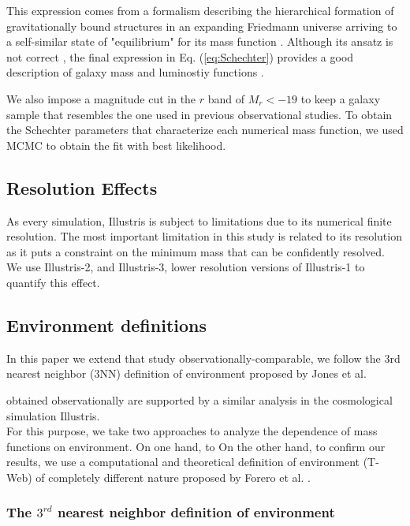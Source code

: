 \documentclass[a4paper,fleqn,usenatbib]{mnras}
\begin{document}
This expression comes from a formalism describing the hierarchical
formation of gravitationally bound structures in an expanding
Friedmann universe arriving to a self-similar state of "equilibrium"
for its mass function \cite{Schechter1976}. 
Although its ansatz is not correct \cite{inaccurateSchechter}, the
final expression in Eq. (\ref{eq:Schechter}) provides a good
description of galaxy mass and luminostiy functions
\cite{wellfitSchechter}. 

We also impose a magnitude cut in the $r$ band of $M_r<-19$ to keep
a galaxy sample that resembles the one used in previous observational
studies. 
To obtain the Schechter parameters that characterize each numerical
mass function, we used MCMC to obtain the fit with best likelihood. 


\subsection{Resolution Effects}

As every simulation, Illustris is subject to limitations due to its
numerical finite resolution.
The most important limitation in this study is related to its
resolution as it puts a constraint on the minimum mass that can be 
confidently resolved.
We use Illustris-2, and Illustris-3, lower resolution versions of
Illustris-1 to quantify this effect.


\subsection{Environment definitions}

In this paper we extend that 
study observationally-comparable, we follow the 3rd nearest neighbor
(3NN) definition of environment proposed by Jones et
al. 


obtained observationally are supported by a similar analysis in the
cosmological simulation Illustris.\\  

For this purpose, we take two approaches to analyze the dependence of mass functions on environment. 
On one hand, to On the other hand, to confirm our results, we use a computational and theoretical definition of environment (T-Web) of completely different nature proposed by Forero et al. \cite{Forero2009}. 

\subsubsection{The $3^{rd}$ nearest neighbor definition of environment}
\end{document}
